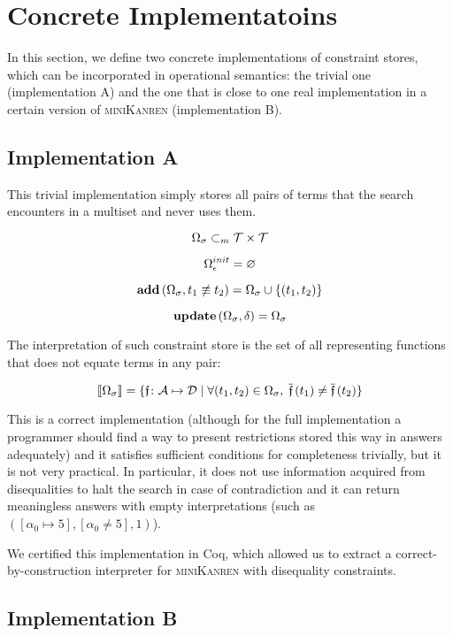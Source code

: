 \section{Concrete Implementatoins}

In this section, we define two concrete implementations of constraint stores, which can be incorporated in operational semantics: the trivial one (implementation A) and the one that is close to one real implementation in a certain version of \textsc{miniKanren} (implementation B).

\subsection{Implementation A}

This trivial implementation simply stores all pairs of terms that the search encounters in a multiset and never uses them.

\[ \Omega_\sigma \subset_m \mathcal{T} \times \mathcal{T} \]

\[ \Omega_\epsilon^{init} = \varnothing \]

\[ \mathbf{add}\,(\Omega_\sigma, t_1 \not\equiv t_2) = \Omega_\sigma \cup \{(t_1, t_2)\} \]

\[ \mathbf{update}\,(\Omega_\sigma, \delta) = \Omega_\sigma \]

The interpretation of such constraint store is the set of all representing functions that does not equate terms in any pair:

\[ \llbracket{\Omega_\sigma}\rrbracket = \{\mathfrak{f} \colon \mathcal{A}\mapsto\mathcal{D} \mid \forall (t_1, t_2) \in \Omega_\sigma, \; \overline{\mathfrak{f}}\,(t_1) \neq \overline{\mathfrak{f}}\,(t_2)\} \]

This is a correct implementation (although for the full implementation a programmer should find a way to present restrictions stored this way in answers adequately) and it satisfies sufficient conditions for completeness trivially, but it is not very practical. In particular, it does not use information acquired from disequalities to halt the search in case of contradiction and it can return meaningless answers with empty interpretations (such as $([\alpha_0 \mapsto 5], [\alpha_0 \neq 5], 1)$).

We certified this implementation in Coq, which allowed us to extract a correct-by-construction interpreter for \textsc{miniKanren} with disequality constraints.

\subsection{Implementation B}

